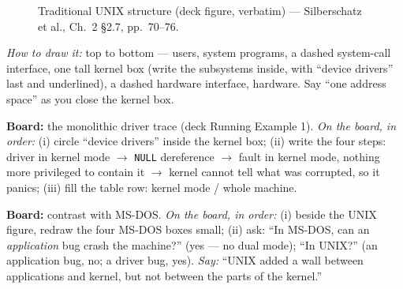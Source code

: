 \documentclass[11pt]{article}
\begin{document}
\begin{figure}[h]
\centering
{}
\caption{Traditional UNIX structure (deck figure, verbatim) --- Silberschatz et al., Ch.~2 \S2.7, pp.~70--76.}
\label{fig:unix}
\end{figure}

\emph{How to draw it:} top to bottom --- users, system programs, a dashed system-call interface, one tall kernel box (write the subsystems inside, with ``device drivers'' last and underlined), a dashed hardware interface, hardware. Say ``one address space'' as you close the kernel box.

\textbf{Board:} the monolithic driver trace (deck Running Example 1). \emph{On the board, in order:} (i) circle ``device drivers'' inside the kernel box; (ii) write the four steps: driver in kernel mode $\to$ \texttt{NULL} dereference $\to$ fault in kernel mode, nothing more privileged to contain it $\to$ kernel cannot tell what was corrupted, so it panics; (iii) fill the table row: kernel mode / whole machine.

\textbf{Board:} contrast with MS-DOS. \emph{On the board, in order:} (i) beside the UNIX figure, redraw the four MS-DOS boxes small; (ii) ask: ``In MS-DOS, can an \emph{application} bug crash the machine?'' (yes --- no dual mode); ``In UNIX?'' (an application bug, no; a driver bug, yes). \emph{Say:} ``UNIX added a wall between applications and kernel, but not between the parts of the kernel.''
\end{document}
